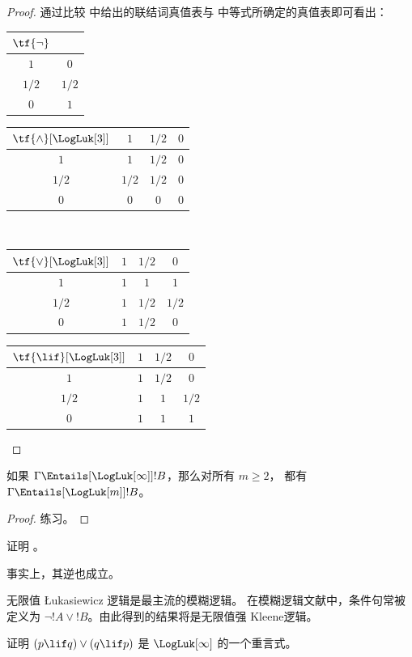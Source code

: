 \documentclass[../../../include/open-logic-section]{subfiles}
\begin{document}
\begin{proof}
  通过比较  中给出的联结词真值表与
   中等式所确定的真值表即可看出：
  \begin{center}
    \begin{tabular}{c|c}
      $\tf{\lnot}$ & \\
      \hline
      $1$ & $0$ \\
      $1/2$ & $1/2$ \\
      $0$ & $1$
    \end{tabular}
    \quad
    \begin{tabular}{c|ccc}
      $\tf{\land}[\LogLuk[3]]$ & $1$ & $1/2$ & $0$ \\
      \hline
      $1$ & $1$ & $1/2$ & $0$ \\
      $1/2$ & $1/2$ & $1/2$ & $0$\\
      $0$ & $0$ & $0$ & $0$
    \end{tabular}
    \\[2ex]
    \begin{tabular}{c|ccc}
      $\tf{\lor}[\LogLuk[3]]$ & $1$ & $1/2$ & $0$ \\
      \hline
      $1$ & $1$ & $1$ & $1$ \\
      $1/2$ & $1$ & $1/2$ & $1/2$ \\
      $0$ & $1$ & $1/2$ & $0$
    \end{tabular}
    \quad
    \begin{tabular}{c|ccc}
      $\tf{\lif}[\LogLuk[3]]$ & $1$ & $1/2$ & $0$ \\
      \hline
      $1$ & $1$ & $1/2$ & $0$ \\
      $1/2$ & $1$ & $1$ & $1/2$  \\
      $0$ & $1$ & $1$ & $1$
    \end{tabular}
  \end{center}
\end{proof}

\begin{prop}
  如果 $\Gamma \Entails[\LogLuk[\infty]] !B$，那么对所有 $m \ge 2$，
  都有 $\Gamma \Entails[\LogLuk[m]] !B$。
\end{prop}

\begin{proof}
  练习。
\end{proof}

\begin{prob}
  证明 。
\end{prob}

事实上，其逆也成立。

无限值 \L ukasiewicz 逻辑是最主流的模糊逻辑。
在模糊逻辑文献中，条件句常被定义为 $\lnot !A \lor !B$。由此得到的结果将是无限值强 Kleene逻辑。

\begin{prob}
  证明 $(p \lif q) \lor (q \lif p)$ 是 $\LogLuk[\infty]$ 的一个重言式。
\end{prob}
\end{document}
